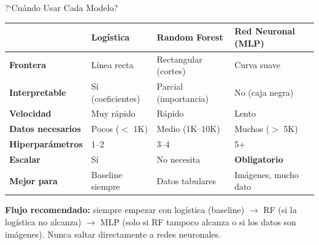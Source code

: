 \documentclass[aspectratio=169, 11pt]{beamer}
\begin{document}
\begin{frame}{?`Cu\'ando Usar Cada Modelo?}
  \vspace{-4pt}
  {\scriptsize
  \begin{tabular}{@{}p{2.5cm}p{3cm}p{3cm}p{3.5cm}@{}}
    \toprule
     & \textbf{\color{codeBlue}Log\'istica} & \textbf{\color{codeOrange}Random Forest} & \textbf{\color{arcaRed}Red Neuronal (MLP)} \\
    \midrule
    \textbf{Frontera} & L\'inea recta & Rectangular (cortes) & Curva suave \\
    \textbf{Interpretable} & S\'i (coeficientes) & Parcial (importancia) & No (caja negra) \\
    \textbf{Velocidad} & Muy r\'apido & R\'apido & Lento \\
    \textbf{Datos necesarios} & Pocos ($<$ 1K) & Medio (1K--10K) & Muchos ($>$ 5K) \\
    \textbf{Hiperpar\'ametros} & 1--2 & 3--4 & 5+ \\
    \textbf{Escalar} & S\'i & No necesita & \textbf{Obligatorio} \\
    \textbf{Mejor para} & Baseline siempre & Datos tabulares & Im\'agenes, mucho dato \\
    \bottomrule
  \end{tabular}
  }

  \vspace{6pt}
  \begin{tcolorbox}[colback=codeGreen!8, colframe=codeGreen, boxrule=0.5pt, arc=2pt,
    left=6pt, right=6pt, top=4pt, bottom=4pt]
    {\scriptsize\color{arcaDark}
    \faLightbulb\hspace{4pt}\textbf{Flujo recomendado:}
    siempre empezar con log\'istica (baseline) $\to$ RF
    (si la log\'istica no alcanza) $\to$ MLP (solo si RF
    tampoco alcanza o si los datos son im\'agenes).
    Nunca saltar directamente a redes neuronales.}
  \end{tcolorbox}
\end{frame}
\end{document}
